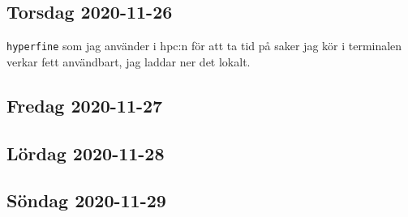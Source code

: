 \subsection{Torsdag 2020-11-26}

\verb|hyperfine| som jag använder i hpc:n för att ta tid på saker jag kör i terminalen verkar fett användbart, jag laddar ner det lokalt.

\subsection{Fredag 2020-11-27}
\subsection{Lördag 2020-11-28}
\subsection{Söndag 2020-11-29}
